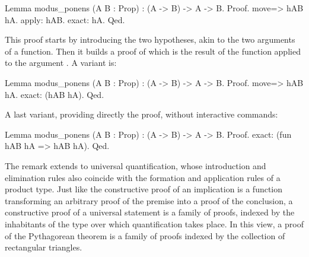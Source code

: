 \begin{coq}{}{}
Lemma modus_ponens (A B : Prop) : (A -> B) -> A -> B.
Proof.
move=> hAB hA.
apply: hAB.
exact: hA.
Qed.
\end{coq}

This proof starts by introducing the two hypotheses, 
akin to the two arguments of a function. Then it builds a proof of 
 which is the result of the function  applied to the argument .
A variant is:

\begin{coq}{}{}
Lemma modus_ponens (A B : Prop) : (A -> B) -> A -> B.
Proof.
move=> hAB hA.
exact: (hAB hA).
Qed.
\end{coq}

A last variant, providing directly the proof, without interactive commands:

\begin{coq}{}{}
Lemma modus_ponens (A B : Prop) : (A -> B) -> A -> B.
Proof.
exact: (fun hAB hA => hAB hA).
Qed.
\end{coq}

The remark extends to universal quantification, whose introduction and
elimination rules also coincide with the formation and application
rules of a product type. Just like the constructive proof of an
implication is a function transforming an arbitrary proof of the
premise into a proof of the conclusion, a constructive proof of a
universal statement is a family of proofs, indexed by the inhabitants
of the type over which quantification takes place. In this view, 
a proof of the Pythagorean theorem is a family of proofs indexed by
the collection of rectangular triangles.







